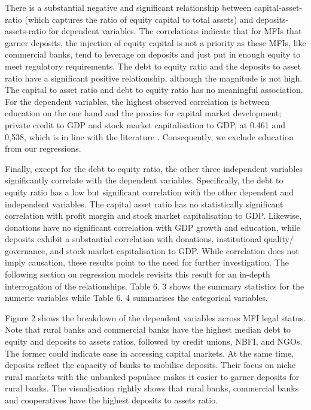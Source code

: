 \documentclass[a4paper, nobind]{templates/ociamthesis}
\begin{document}
There is a substantial negative and significant relationship between capital-asset-ratio (which captures the ratio of equity capital to total assets) and deposits-assets-ratio for dependent variables. The correlations indicate that for MFIs that garner deposits, the injection of equity capital is not a priority as these MFIs, like commercial banks, tend to leverage on deposits and just put in enough equity to meet regulatory requirements. The debt to equity ratio and the deposits to asset ratio have a significant positive relationship, although the magnitude is not high. The capital to asset ratio and debt to equity ratio has no meaningful association. For the dependent variables, the highest observed correlation is between education on the one hand and the proxies for capital market development; private credit to GDP and stock market capitalisation to GDP, at 0.461 and 0,538, which is in line with the literature \autocite{allen2013resolving,allen2014african}. Consequently, we exclude education from our regressions.

Finally, except for the debt to equity ratio, the other three independent variables significantly correlate with the dependent variables. Specifically, the debt to equity ratio has a low but significant correlation with the other dependent and independent variables. The capital asset ratio has no statistically significant correlation with profit margin and stock market capitalisation to GDP. Likewise, donations have no significant correlation with GDP growth and education, while deposits exhibit a substantial correlation with donations, institutional quality/ governance, and stock market capitalisation to GDP. While correlation does not imply causation, these results point to the need for further investigation. The following section on regression models revisits this result for an in-depth interrogation of the relationships. Table 6. 3 shows the summary statistics for the numeric variables while Table 6. 4 summarises the categorical variables.

Figure 2 shows the breakdown of the dependent variables across MFI legal status. Note that rural banks and commercial banks have the highest median debt to equity and deposits to assets ratios, followed by credit unions, NBFI, and NGOs. The former could indicate ease in accessing capital markets. At the same time, deposits reflect the capacity of banks to mobilise deposits. Their focus on niche rural markets with the unbanked populace makes it easier to garner deposits for rural banks. The visualisation rightly shows that rural banks, commercial banks and cooperatives have the highest deposits to assets ratio.
\end{document}
